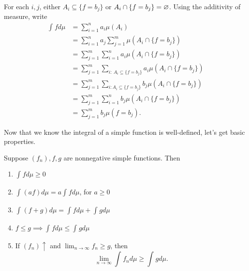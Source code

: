 For each $i,j$, either $A_i \subseteq \{f=b_j\}$ or $A_i \cap \{f = b_j\} = \varnothing$.
Using the additivity of measure, write
\begin{align*}
	\int_{}^{} fd\mu &= \sum\limits_{i=1}^{n} a_i \mu(A_i) \\
	&= \sum\limits_{i=1}^{n} a_j \sum\limits_{j=1}^{m} \mu\left( A_i \cap \{f = b_j\} \right) \\
	&= \sum\limits_{j=1}^{m} \sum\limits_{i=1}^{n} a_i \mu\left( A_i \cap \{f = b_j\} \right) \\
	&= \sum\limits_{j=1}^{m} \sum\limits_{i:\ A_i \subseteq \{f = b_j\}}^{} a_i \mu\left( A_i \cap \{f=b_j\} \right) \\
	&= \sum\limits_{j=1}^{m} \sum\limits_{i: A_i \subseteq \{f = b_j\}}^{} b_j \mu\left( A_i \cap \{f= b_j\} \right) \\
	&= \sum\limits_{j=1}^{m} \sum\limits_{i=1}^{n} b_j \mu\left( A_i \cap \{f=b_j\} \right) \\
	&= \sum\limits_{j=1}^{m} b_j \mu\left( f = b_j \right)
.\end{align*}

Now that we know the integral of a simple function is well-defined, let's get basic properties.
\begin{lemma}
	Suppose $(f_n), f, g$ are nonnegative simple functions. Then
	\begin{enumerate}[label=(\roman*)]
		\item $\int_{}^{} fd\mu \ge 0 $
		\item $\int_{}^{} \left( af \right)d\mu = a \int_{}^{} fd\mu  $, for $a \ge 0$ 
		\item $\int_{}^{} (f+g)d\mu = \int_{}^{} fd\mu + \int_{}^{} gd\mu   $
		\item $f \le g \implies \int_{}^{} fd\mu \le \int_{}^{} gd\mu  $
		\item If $\left( f_n \right) \uparrow$ and $\lim_{n \to \infty} f_n \ge g$, then \[
			\lim_{n \to \infty} \int_{}^{} f_n d\mu \ge \int_{}^{} g d\mu 
		.\] 
	\end{enumerate}
\end{lemma}


